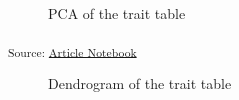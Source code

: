 \documentclass[
]{article}
\begin{document}
\begin{figure}[H]


\caption{\label{fig-pca}PCA of the trait table}

\end{figure}%

\textsubscript{Source:
\href{https://BecksLab.github.io/ms_t_is_for_topology/index.qmd.html}{Article
Notebook}}

\begin{figure}[H]


\caption{\label{fig-dendo}Dendrogram of the trait table}

\end{figure}%
\end{document}
